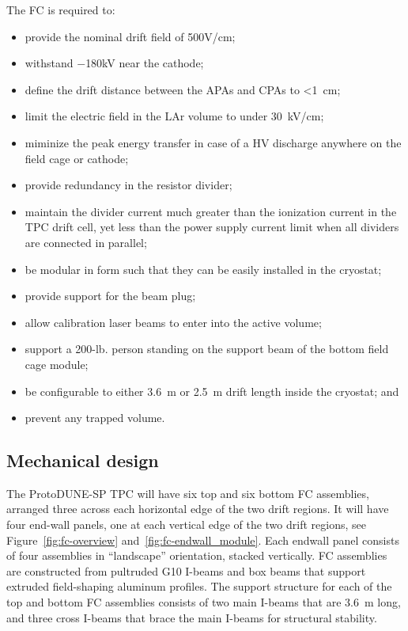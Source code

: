 The FC is required to:
\begin{itemize}
\item provide the nominal drift field of 500V/cm;
\item withstand $-$180kV near the cathode;
\item define the drift distance between the APAs and CPAs to <1~cm;
\item limit the electric field in the LAr volume to under 30~kV/cm;
\item miminize the peak energy transfer in case of a HV discharge anywhere on the field cage or cathode;
\item provide redundancy in the resistor divider; 
\item maintain the divider current much greater than the ionization current in the TPC drift cell, yet less than the power supply current limit when all dividers are connected in parallel;
\item be modular in form such that they can be easily installed in the cryostat;
\item provide support for the beam plug;
\item allow calibration laser beams to enter into the active volume; 
\item support a 200-lb. person standing on the support beam of the bottom field cage module;
\item be configurable to either 3.6~m or 2.5~m drift length inside the cryostat; and
\item prevent any trapped volume.
\end{itemize}

\subsection{Mechanical design}

The ProtoDUNE-SP TPC will have six top and six bottom FC assemblies, arranged three across each horizontal edge of the two drift regions. It will have 
four end-wall panels, one at each vertical edge of the two drift regions, see Figure~\ref{fig:fc-overview} and~\ref{fig:fc-endwall_module}.
Each endwall panel consists of four assemblies in ``landscape'' orientation, stacked vertically.
FC assemblies are constructed from pultruded G10 I-beams and box beams that support extruded field-shaping aluminum profiles. The support structure for each of the top and bottom FC assemblies consists of two main I-beams that are 3.6~m long, and three cross I-beams that brace the main I-beams for structural stability.



